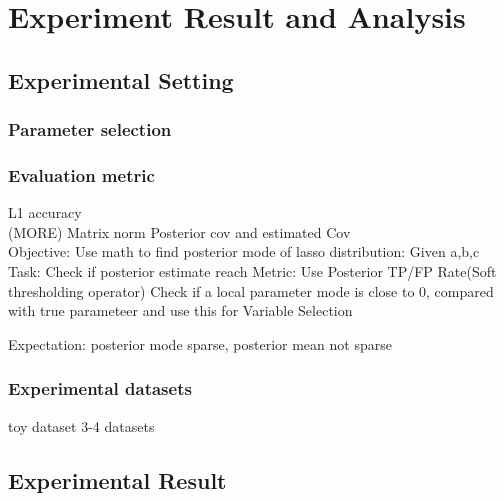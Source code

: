 \chapter{Experiment Result and Analysis}
\label{Chapter4}
\section{Experimental Setting}
\subsection{Parameter selection}
\subsection{Evaluation metric}
L1 accuracy\\
(MORE) Matrix norm Posterior cov and estimated Cov\\

Objective: Use math to find posterior mode of lasso distribution: Given a,b,c
Task: Check if posterior estimate reach 
Metric: Use Posterior TP/FP Rate(Soft thresholding operator) Check if a local parameter mode is close to 0, compared with true parameteer and use this for 
Variable Selection

Expectation: posterior mode sparse, posterior mean not sparse

\subsection{Experimental datasets}
toy dataset
3-4 datasets
\section{Experimental Result}

